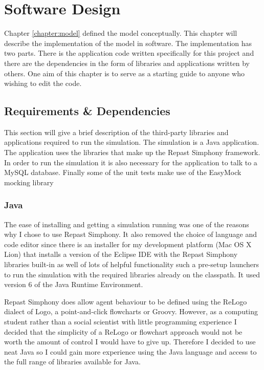 \chapter{Software Design}\label{chapter:softwaredesign}

Chapter \ref{chapter:model} defined the model conceptually. This
chapter will describe the implementation of the model in software. The
implementation has two parts. There is the application code written
specifically for this project and there are the dependencies in the
form of libraries and applications written by others. One aim of this
chapter is to serve as a starting guide to anyone who wishing to edit
the code.


\section{Requirements \& Dependencies}
This section will give a brief description of the third-party
libraries and applications required to run the simulation. The
simulation is a Java application. The application uses the libraries that make up the Repast Simphony
framework. In order to run the simulation it is also necessary for the
application to talk to a MySQL database. Finally some of the unit 
tests make use of the EasyMock mocking library 

  \subsection{Java}
  The ease of installing and getting a simulation running was one of
  the reasons why I chose to use Repast Simphony. It also removed the
  choice of language and code editor since there is an
  installer for my development platform (Mac OS X Lion) that installs a version of the Eclipse IDE
  with the Repast Simphony libraries built-in as well of lots of
  helpful functionality such a pre-setup launchers to run the simulation
  with the required libraries already on the classpath. It used
  version 6 of the Java Runtime Environment.

  Repast Simphony does allow agent behaviour to be defined using the
  ReLogo dialect of Logo, a point-and-click flowcharts or
  Groovy. However, as a computing student rather than a social
  scientist with little programming experience I decided that the
  simplicity of a ReLogo or flowchart approach would not be worth the
  amount of control I would have to give up. Therefore I decided to use neat Java so I could gain more
  experience using the Java language and
  access to the full range of libraries available for Java.

